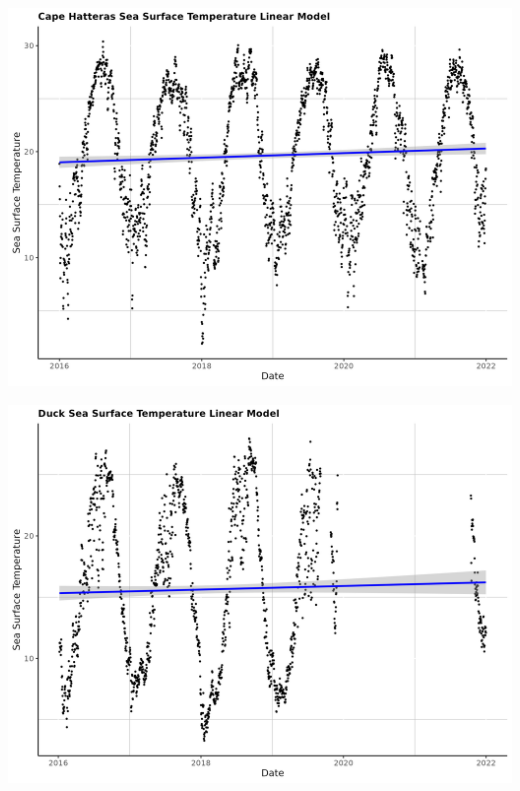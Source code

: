 \documentclass{article}
\begin{document}
\includegraphics[scale=0.5]{chsstglm}

\includegraphics[scale=0.5]{ducksstglm}
\end{document}
